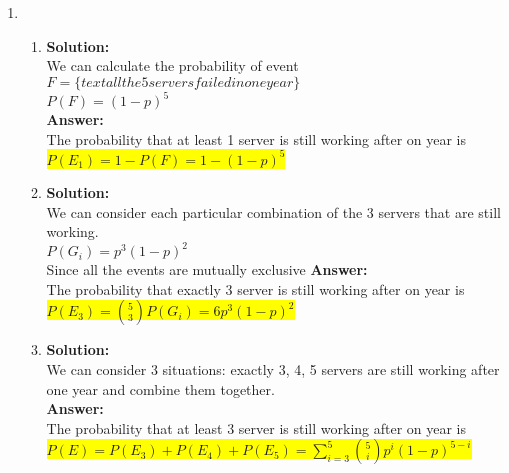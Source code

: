 \documentclass{article}
\newcommand{\myansw}{\textbf{Answer:}\\}
\newcommand{\mysolu}{\textbf{Solution:}\\}
\begin{document}
\begin{enumerate}
\begin{enumerate}
	\end{enumerate}
	\item
	\begin{enumerate}
		\item
		\mysolu
		We can calculate the probability of event ${F=\{text{all the 5 servers failed in one year}\}}$\\
		${P(F)=(1-p)^5}$\\
		\myansw
		The probability that at least 1 server is still working after on year is\\
		\colorbox{yellow}{${P(E_1)=1-P(F)=1-(1-p)^5}$}\\
		\item
		\mysolu
		We can consider each particular combination of the 3 servers that are still working.\\
		${P(G_i)=p^3(1-p)^2}$\\
		Since all the events are mutually exclusive
		\myansw
		The probability that exactly 3 server is still working after on year is\\
		\colorbox{yellow}{
			${P(E_3)={5 \choose 3}P(G_i)=6p^3(1-p)^2}$
		}\\
		\item
		\mysolu
		We can consider 3 situations: exactly 3, 4, 5 servers are still working after one year and combine them together.\\
		\myansw
		The probability that at least 3 server is still working after on year is\\
		\colorbox{yellow}{
			${P(E)=P(E_3)+P(E_4)+P(E_5)=\sum\limits_{i=3}^5 {5 \choose i}p^i(1-p)^{5-i}}$
		}\\
		

\end{enumerate}
\end{enumerate}
\end{document}
